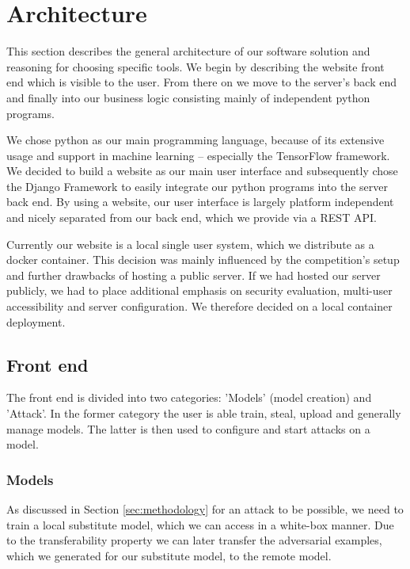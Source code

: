 
\section{Architecture}

This section describes the general architecture of our software solution and reasoning for choosing specific tools.
We begin by describing the website front end which is visible to the user.
From there on we move to the server's back end and finally into our business logic consisting mainly of independent python programs.

We chose python as our main programming language, because of its extensive usage and support in machine learning -- especially the TensorFlow framework.
We decided to build a website as our main user interface and subsequently chose the Django Framework to easily integrate our python programs into the server back end.
By using a website, our user interface is largely platform independent and nicely separated from our back end, which we provide via a REST API.

Currently our website is a local single user system, which we distribute as a docker container.
This decision was mainly influenced by the competition's setup and further drawbacks of hosting a public server.
If we had hosted our server publicly, we had to place additional emphasis on security evaluation, multi-user accessibility and server configuration.
We therefore decided on a local container deployment.

\subsection{Front end}

The front end is divided into two categories: 'Models' (model creation) and 'Attack'. In the former category the user is able train, steal, upload and generally manage models. The latter is then used to configure and start attacks on a model.

\subsubsection{Models}

As discussed in Section \ref{sec:methodology} for an attack to be possible, we need to train a local substitute model, which we can access in a white-box manner.
Due to the transferability property we can later transfer the adversarial examples, which we generated for our substitute model, to the remote model.

